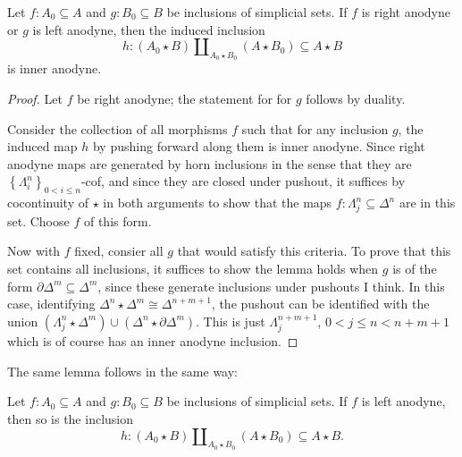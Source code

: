 \begin{lemma}\label{2.1.2.5}
	Let $f : A_0 \subseteq A$ and $g : B_0 \subseteq B$ be inclusions of simplicial sets. If $f$ is right anodyne or $g$ is left anodyne, then the induced inclusion
	\[
		h : (A_0 \star B) \amalg _{A_0\star B_0} (A\star B_0)\subseteq A\star B
	\]
	is inner anodyne.
\end{lemma}
\begin{proof}
	Let $f$ be right anodyne; the statement for for $g$ follows by duality.

	Consider the collection of all morphisms $f$ such that for any inclusion $g$, the induced map $h$ by pushing forward along them is inner anodyne. Since right anodyne maps are generated by horn inclusions in the sense that they are $\left\{ \Lambda_i^n \right\}_{0<i \leq n} $-cof, and since they are closed under pushout, it suffices by cocontinuity of $\star $ in both arguments to show that the maps $f : \Lambda _j^n \subseteq \Delta ^n$ are in this set. Choose $f$ of this form.

	Now with $f$ fixed, consier all $g$ that would satisfy this criteria. To prove that this set contains all inclusions, it suffices to show the lemma holds when $g$ is of the form $\partial \Delta ^m \subseteq \Delta ^m$, since these generate inclusions under pushouts I think. In this case, identifying $\Delta ^n \star \Delta ^m \cong \Delta ^{n+m+1} $, the pushout can be identified with the union $(\Lambda _j^n \star \Delta ^{m} ) \cup (\Delta ^n\star \partial \Delta ^m)$. This is just $\Lambda _j^{n+m+1} $, $0<j\leq n < n+m+1$ which is of course has an inner anodyne inclusion.
\end{proof}

The same lemma follows in the same way:

\begin{lemma}\label{2.1.2.6}
	Let $f : A_0 \subseteq A$ and $g : B_0 \subseteq B$ be inclusions of simplicial sets. If $f$ is left anodyne, then so is the inclusion
	\[
		h : (A_0\star B) \amalg _{A_0\star B_0} (A \star B_0) \subseteq A \star B
	.\]
\end{lemma}

